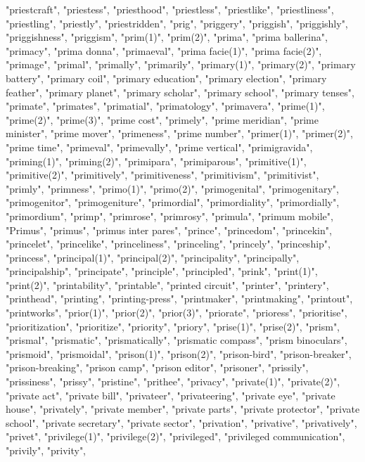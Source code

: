 "priestcraft",
"priestess",
"priesthood",
"priestless",
"priestlike",
"priestliness",
"priestling",
"priestly",
"priestridden",
"prig",
"priggery",
"priggish",
"priggishly",
"priggishness",
"priggism",
"prim(1)",
"prim(2)",
"prima",
"prima ballerina",
"primacy",
"prima donna",
"primaeval",
"prima facie(1)",
"prima facie(2)",
"primage",
"primal",
"primally",
"primarily",
"primary(1)",
"primary(2)",
"primary battery",
"primary coil",
"primary education",
"primary election",
"primary feather",
"primary planet",
"primary scholar",
"primary school",
"primary tenses",
"primate",
"primates",
"primatial",
"primatology",
"primavera",
"prime(1)",
"prime(2)",
"prime(3)",
"prime cost",
"primely",
"prime meridian",
"prime minister",
"prime mover",
"primeness",
"prime number",
"primer(1)",
"primer(2)",
"prime time",
"primeval",
"primevally",
"prime vertical",
"primigravida",
"priming(1)",
"priming(2)",
"primipara",
"primiparous",
"primitive(1)",
"primitive(2)",
"primitively",
"primitiveness",
"primitivism",
"primitivist",
"primly",
"primness",
"primo(1)",
"primo(2)",
"primogenital",
"primogenitary",
"primogenitor",
"primogeniture",
"primordial",
"primordiality",
"primordially",
"primordium",
"primp",
"primrose",
"primrosy",
"primula",
"primum mobile",
"Primus",
"primus",
"primus inter pares",
"prince",
"princedom",
"princekin",
"princelet",
"princelike",
"princeliness",
"princeling",
"princely",
"princeship",
"princess",
"principal(1)",
"principal(2)",
"principality",
"principally",
"principalship",
"principate",
"principle",
"principled",
"prink",
"print(1)",
"print(2)",
"printability",
"printable",
"printed circuit",
"printer",
"printery",
"printhead",
"printing",
"printing-press",
"printmaker",
"printmaking",
"printout",
"printworks",
"prior(1)",
"prior(2)",
"prior(3)",
"priorate",
"prioress",
"prioritise",
"prioritization",
"prioritize",
"priority",
"priory",
"prise(1)",
"prise(2)",
"prism",
"prismal",
"prismatic",
"prismatically",
"prismatic compass",
"prism binoculars",
"prismoid",
"prismoidal",
"prison(1)",
"prison(2)",
"prison-bird",
"prison-breaker",
"prison-breaking",
"prison camp",
"prison editor",
"prisoner",
"prissily",
"prissiness",
"prissy",
"pristine",
"prithee",
"privacy",
"private(1)",
"private(2)",
"private act",
"private bill",
"privateer",
"privateering",
"private eye",
"private house",
"privately",
"private member",
"private parts",
"private protector",
"private school",
"private secretary",
"private sector",
"privation",
"privative",
"privatively",
"privet",
"privilege(1)",
"privilege(2)",
"privileged",
"privileged communication",
"privily",
"privity",
